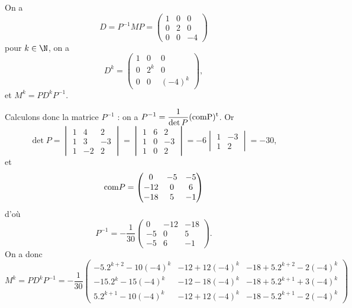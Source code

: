{\begin{enumerate}
{On a $$D=P^{-1}MP=\begin{pmatrix}1&0&0 \\ 0&2&0 \\ 0&0&-4\end{pmatrix}$$
pour $k\in\N$, on a 
$$D^k=\begin{pmatrix}1&0&0 \\ 0&2^k&0 \\ 0&0&(-4)^k\end{pmatrix},$$
et $M^k=PD^kP^{-1}.$

Calculons donc la matrice $P^{-1}$ : on a $\displaystyle P^{-1}={\frac{1}{\det P}}(\rm{com} P)^t$. Or
$$\det P=\begin{vmatrix}1&4&2 \\ 1&3&-3 \\ 1&-2&2\end{vmatrix}=\begin{vmatrix}1&6&2 \\ 1&0&-3 \\ 1&0&2\end{vmatrix}=
-6\begin{vmatrix}1&-3 \\ 1&2\end{vmatrix}=-30,$$ et
$${\rm com}P=\begin{pmatrix}0&-5&-5 \\ -12&0&6 \\ -18&5&-1\end{pmatrix}$$ d'o\`u
$$P^{-1}=-{\frac{1}{30}}\begin{pmatrix}0&-12&-18 \\ -5&0&5 \\ -5&6&-1\end{pmatrix}.$$
On a donc 
$$M^k=PD^kP^{-1}=-{\frac{1}{30}}
\begin{pmatrix}-5.2^{k+2}-10(-4)^k&-12+12(-4)^k&-18+5.2^{k+2}-2(-4)^k \\ 
-15.2^{k}-15(-4)^k&-12-18(-4)^k&-18+5.2^{k+1}+3(-4)^k \\ 
5.2^{k+1}-10(-4)^k&-12+12(-4)^k&-18-5.2^{k+1}-2(-4)^k\end{pmatrix}$$}
\end{enumerate}
}
